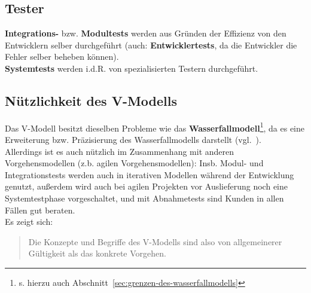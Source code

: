 \subsection*{Tester}
\textbf{Integrations-} bzw. \textbf{Modultests} werden aus Gründen der Effizienz von den Entwicklern selber durchgeführt (auch: \textbf{Entwicklertests}, da die Entwickler die Fehler selber beheben können).\\
\textbf{Systemtests} werden i.d.R. von spezialisierten Testern durchgeführt.

\subsection*{Nützlichkeit des V-Modells}
Das V-Modell besitzt dieselben Probleme wie das \textbf{Wasserfallmodell}\footnote{
s. hierzu auch Abschnitt~\ref{sec:grenzen-des-wasserfallmodells}
}, da es eine Erweiterung bzw. Präzisierung des Wasserfallmodells darstellt (vgl.~\cite[12]{Wed09c}).\\
Allerdings ist es auch nützlich im Zusammenhang mit anderen Vorgehensmodellen (z.b. agilen Vorgehensmodellen): Insb. Modul- und Integrationstests werden auch in iterativen Modellen während der Entwicklung genutzt, außerdem wird auch bei agilen Projekten vor Auslieferung noch eine Systemtestphase vorgeschaltet, und mit Abnahmetests sind Kunden in allen Fällen gut beraten.\\

\noindent
Es zeigt sich:

\begin{tcolorbox}[colback=white]
    \blockquote[{\cite[12]{Wed09c}}]{
        Die Konzepte und Begriffe des V-Modells sind also von allgemeinerer Gültigkeit als das konkrete Vorgehen.
    }
\end{tcolorbox}
